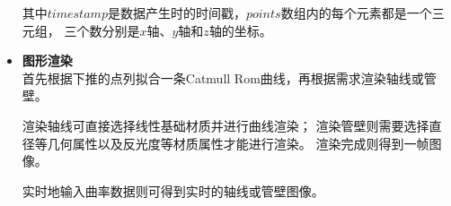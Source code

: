 \begin{itemize}
其中$timestamp$是数据产生时的时间戳，$points$数组内的每个元素都是一个三元组，
三个数分别是$x$轴、$y$轴和$z$轴的坐标。

\item \textbf{图形渲染} \\

首先根据下推的点列拟合一条Catmull Rom曲线，再根据需求渲染轴线或管壁。

渲染轴线可直接选择线性基础材质并进行曲线渲染；
渲染管壁则需要选择直径等几何属性以及反光度等材质属性才能进行渲染。
渲染完成则得到一帧图像。

实时地输入曲率数据则可得到实时的轴线或管壁图像。

\end{itemize}

